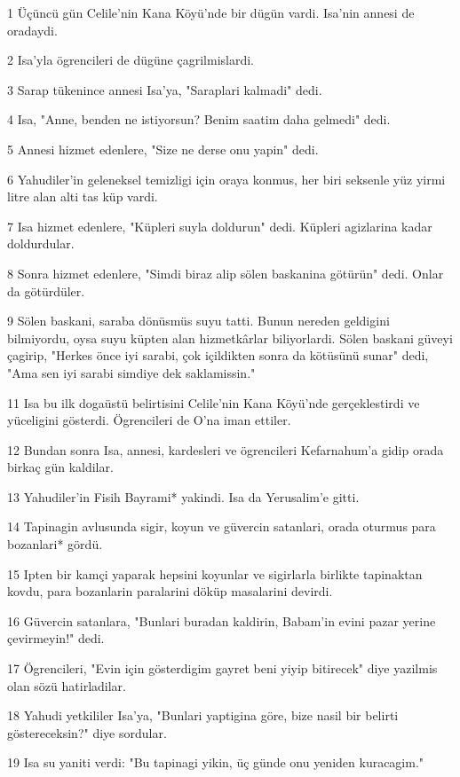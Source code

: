 \par 1 Üçüncü gün Celile'nin Kana Köyü'nde bir dügün vardi. Isa'nin annesi de oradaydi.
\par 2 Isa'yla ögrencileri de dügüne çagrilmislardi.
\par 3 Sarap tükenince annesi Isa'ya, "Saraplari kalmadi" dedi.
\par 4 Isa, "Anne, benden ne istiyorsun? Benim saatim daha gelmedi" dedi.
\par 5 Annesi hizmet edenlere, "Size ne derse onu yapin" dedi.
\par 6 Yahudiler'in geleneksel temizligi için oraya konmus, her biri seksenle yüz yirmi litre alan alti tas küp vardi.
\par 7 Isa hizmet edenlere, "Küpleri suyla doldurun" dedi. Küpleri agizlarina kadar doldurdular.
\par 8 Sonra hizmet edenlere, "Simdi biraz alip sölen baskanina götürün" dedi. Onlar da götürdüler.
\par 9 Sölen baskani, saraba dönüsmüs suyu tatti. Bunun nereden geldigini bilmiyordu, oysa suyu küpten alan hizmetkârlar biliyorlardi. Sölen baskani güveyi çagirip, "Herkes önce iyi sarabi, çok içildikten sonra da kötüsünü sunar" dedi, "Ama sen iyi sarabi simdiye dek saklamissin."
\par 11 Isa bu ilk dogaüstü belirtisini Celile'nin Kana Köyü'nde gerçeklestirdi ve yüceligini gösterdi. Ögrencileri de O'na iman ettiler.
\par 12 Bundan sonra Isa, annesi, kardesleri ve ögrencileri Kefarnahum'a gidip orada birkaç gün kaldilar.
\par 13 Yahudiler'in Fisih Bayrami* yakindi. Isa da Yerusalim'e gitti.
\par 14 Tapinagin avlusunda sigir, koyun ve güvercin satanlari, orada oturmus para bozanlari* gördü.
\par 15 Ipten bir kamçi yaparak hepsini koyunlar ve sigirlarla birlikte tapinaktan kovdu, para bozanlarin paralarini döküp masalarini devirdi.
\par 16 Güvercin satanlara, "Bunlari buradan kaldirin, Babam'in evini pazar yerine çevirmeyin!" dedi.
\par 17 Ögrencileri, "Evin için gösterdigim gayret beni yiyip bitirecek" diye yazilmis olan sözü hatirladilar.
\par 18 Yahudi yetkililer Isa'ya, "Bunlari yaptigina göre, bize nasil bir belirti göstereceksin?" diye sordular.
\par 19 Isa su yaniti verdi: "Bu tapinagi yikin, üç günde onu yeniden kuracagim."
